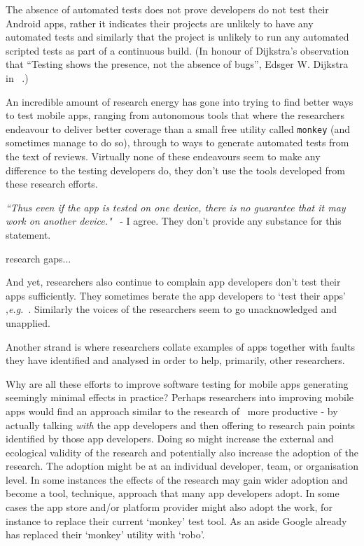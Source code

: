 The absence of automated tests does not prove developers do not test their Android apps, rather it indicates their projects are unlikely to have any automated tests and similarly that the project is unlikely to run any automated scripted tests as part of a continuous build. (In honour of Dijkstra's observation that ``Testing shows the presence, not the absence of bugs'', Edsger W. Dijkstra in ~\citet[p. 16]{randell1970_software_engineering_techniques_nato_dijkstra}.) %

An incredible amount of research energy has gone into trying to find better ways to test mobile apps, ranging from autonomous tools that where the researchers endeavour to deliver better coverage than a small free utility called \texttt{monkey} (and sometimes manage to do so), through to ways to generate automated tests from the text of reviews. Virtually none of these endeavours seem to make any difference to the testing developers do, they don't use the tools developed from these research efforts. 

\emph{``Thus even if the app is tested on one device, there is no guarantee that it may work on another device."}~\citep[p. 27]{nagappan2016_future_trends_in_sw_eng_for_mobile_apps} - I agree. They don't provide any substance for this statement.

research gaps...

And yet, researchers also continue to complain app developers don't test their apps sufficiently. They sometimes berate the app developers to `test their apps' ,\emph{e.g.}~\citet{cruz2019_guess_what_test_your_app}.
Similarly the voices of the researchers seem to go unacknowledged and unapplied.

Another strand is where researchers collate examples of apps together with faults they have identified and analysed in order to help, primarily, other researchers. 

Why are all these efforts to improve software testing for mobile apps generating seemingly minimal effects in practice? Perhaps researchers into improving mobile apps would find an approach similar to the research of~\citet{winter2022_lets_talk_with_developers_etc_automatic_program_repair} more productive - by actually talking \emph{with} the app developers and then offering to research pain points identified by those app developers. Doing so might increase the external and ecological validity of the research and potentially also increase the adoption of the research. The adoption might be at an individual developer, team, or organisation level. In some instances the effects of the research may gain wider adoption and become a tool, technique, approach that many app developers adopt. In some cases the app store and/or platform provider might also adopt the work, for instance to replace their current `monkey' test tool. As an aside Google already has replaced their `monkey' utility with `robo'.

